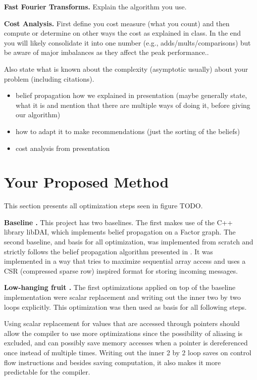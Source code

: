 \documentclass[letterpaper]{article}
\let\cref=\Cref %
\newcommand{\mypar}[1]{{\bf #1.}}
\begin{document}
\mypar{Fast Fourier Transforms}
Explain the algorithm you use.

\mypar{Cost Analysis}
First define you cost measure (what you count) and then compute or determine on other ways the
cost as explained in class. In the end you will likely consolidate it into one number (e.g., adds/mults/comparisons) but be aware of major imbalances as they affect the peak performance..

Also state what is known about the complexity (asymptotic usually)
about your problem (including citations).

\begin{itemize}
\item belief propagation how we explained in presentation (maybe generally state, what it is and mention that there are multiple ways of doing it, before giving our algorithm)
\item how to adapt it to make recommendations (just the sorting of the beliefs)
\item cost analysis from presentation
\end{itemize}


\section{Your Proposed Method}\label{sec:yourmethod}

This section presents all optimization steps seen in figure TODO.

\mypar{Baseline }
This project has two baselines. The first makes use of the C++ library libDAI, which implements belief propagation on a Factor graph.
The second baseline, and basis for all optimization, was implemented from scratch and strictly follows the belief propagation algorithm presented in \cref{sec:background}. It was implemented in a way that tries to maximize sequential array access and uses a CSR (compressed sparse row) inspired format for storing incoming messages.

\mypar{Low-hanging fruit }
The first optimizations applied on top of the baseline implementation were scalar replacement and writing out the inner two by two loops explicitly.  This optimization was then used as basis for all following steps.

Using scalar replacement for values that are accessed through pointers should allow the compiler to use more optimizations since the possibility of aliasing is excluded, and can possibly save memory accesses when a pointer is dereferenced once instead of multiple times.
Writing out the inner 2 by 2 loop saves on control flow instructions and besides saving computation, it also makes it more predictable for the compiler. 
\end{document}
